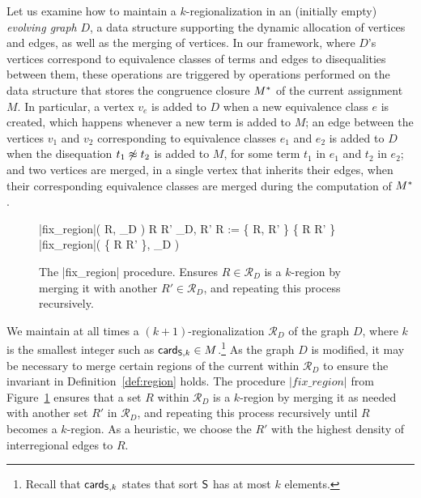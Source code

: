 \documentclass{svjour3}                     %
\begin{document}
Let us examine how to maintain a $k$-regionalization in an (initially empty) \emph{evolving graph} $D$,
a data structure supporting the dynamic allocation of vertices and edges, 
as well as the merging of vertices.
In our framework, where $D$'s vertices correspond to equivalence classes of terms and 
edges to disequalities between them, 
these operations are triggered by operations performed on the data structure
that stores the congruence closure $\cc M$ of the current assignment $M$.
In particular, a vertex $v_e$ is added to $D$ when a new equivalence class $e$ is created,
which happens whenever a new term is added to $M$;
an edge between the vertices $v_1$ and $v_2$ corresponding to equivalence classes $e_1$ and $e_2$
is added to $D$ when the disequation $t_1 \tneq t_2$ is added to $M$, 
for some term $t_1$ in $e_1$ and $t_2$ in $e_2$; 
and 
two vertices are merged, in a single vertex that inherits their edges, 
when their corresponding equivalence classes are merged during the computation of $\cc M$.


\begin{figure}[t]
\begin{program}
\PROC |fix\_region|( R, _D ) \BODY 
  \IF R 
     R' \in {}_D,  R' \neq R
     :=  \setminus \{ R, R' \} \cup \{ R \cup R' \}
    |fix\_region|( \{ R \cup R' \}, _D )
  \FI
\ENDPROC
\end{program}
\vspace{-2ex}
\caption{The |fix\_region| procedure. Ensures $R \in \mathcal{R}_D$ is a $k$-region
by merging it with another $R' \in \mathcal{R}_D$, and repeating this process recursively.
}
\label{fig:fix-region}
\end{figure}

We maintain at all times a $(k+1)$-regionalization $\mathcal{R}_D$ of the graph $D$, 
where $k$ is the smallest integer such as $\card[\So,k] \in M$.\footnote{%
Recall that $\card[\So,k]$ states that sort $\So$ has at most $k$ elements.
}
As the graph $D$ is modified, it may be necessary to merge certain 
regions of the current within $\mathcal{R}_D$ 
to ensure the invariant in Definition~\ref{def:region} holds.
The procedure $|fix\_region|$ from Figure~\ref{fig:fix-region} ensures 
that a set $R$ within $\mathcal{R}_D$ is a $k$-region by merging it as needed 
with another set $R'$ in $\mathcal{R}_D$, and repeating this process 
recursively until $R$ becomes a $k$-region.
As a heuristic, we choose the $R'$ with the highest density of interregional edges to $R$.
\end{document}
